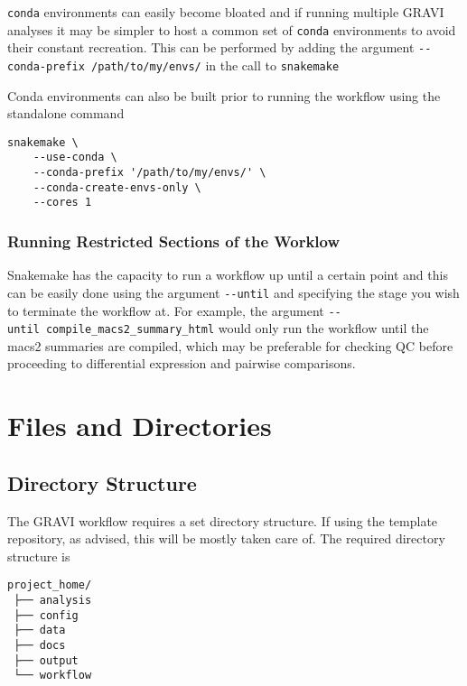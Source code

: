 \documentclass[
]{book}
\begin{document}
\texttt{conda} environments can easily become bloated and if running multiple GRAVI analyses it may be simpler to host a common set of \texttt{conda} environments to avoid their constant recreation.
This can be performed by adding the argument \texttt{-\/-conda-prefix\ \textquotesingle{}/path/to/my/envs/\textquotesingle{}} in the call to \texttt{snakemake}

Conda environments can also be built prior to running the workflow using the standalone command

\begin{verbatim}
snakemake \
    --use-conda \
    --conda-prefix '/path/to/my/envs/' \
    --conda-create-envs-only \
    --cores 1
\end{verbatim}

\hypertarget{running-restricted-sections-of-the-worklow}{%
\subsection{Running Restricted Sections of the Worklow}\label{running-restricted-sections-of-the-worklow}}

Snakemake has the capacity to run a workflow up until a certain point and this can be easily done using the argument \texttt{-\/-until} and specifying the stage you wish to terminate the workflow at. For example, the argument \texttt{-\/-until\ compile\_macs2\_summary\_html} would only run the workflow until the macs2 summaries are compiled, which may be preferable for checking QC before proceeding to differential expression and pairwise comparisons.

\hypertarget{input-files}{%
\chapter{Files and Directories}\label{input-files}}

\hypertarget{directories}{%
\section{Directory Structure}\label{directories}}

The GRAVI workflow requires a set directory structure.
If using the template repository, as advised, this will be mostly taken care of.
The required directory structure is

\begin{verbatim}
project_home/
 ├── analysis
 ├── config
 ├── data
 ├── docs
 ├── output
 └── workflow
\end{verbatim}
\end{document}

